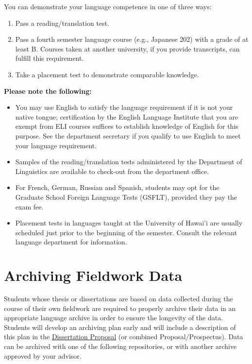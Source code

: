\documentclass[
]{book}
\providecommand{\tightlist}{%
  \setlength{\itemsep}{0pt}\setlength{\parskip}{0pt}}
\begin{document}
You can demonstrate your language competence in one of three ways:

\begin{enumerate}
\def\labelenumi{\arabic{enumi}.}
\tightlist
\item
  Pass a reading/translation test.
\item
  Pass a fourth semester language course (e.g., Japanese 202) with a grade of at least B. Courses taken at another university, if you provide transcripts, can fulfill this requirement.
\item
  Take a placement test to demonstrate comparable knowledge.
\end{enumerate}

\textbf{Please note the following:}

\begin{itemize}
\tightlist
\item
  You may use English to satisfy the language requirement if it is not your native tongue; certification by the English Language Institute that you are exempt from ELI courses suffices to establish knowledge of English for this purpose. See the department secretary if you qualify to use English to meet your language requirement.
\item
  Samples of the reading/translation tests administered by the Department of Linguistics are available to check-out from the department office.
\item
  For French, German, Russian and Spanish, students may opt for the Graduate School Foreign Language Tests (GSFLT), provided they pay the exam fee.
\item
  Placement tests in languages taught at the University of Hawai'i are usually scheduled just prior to the beginning of the semester. Consult the relevant language department for information.
\end{itemize}

\hypertarget{archiving}{%
\section{Archiving Fieldwork Data}\label{archiving}}

Students whose thesis or dissertations are based on data collected during the course of their own fieldwork are required to properly archive their data in an appropriate language archive in order to ensure the longevity of the data. Students will develop an archiving plan early and will include a description of this plan in the \protect\hyperlink{dissertation-proposal}{Dissertation Proposal} (or combined Proposal/Prospectus). Data can be archived with one of the following repositories, or with another archive approved by your advisor.
\end{document}
